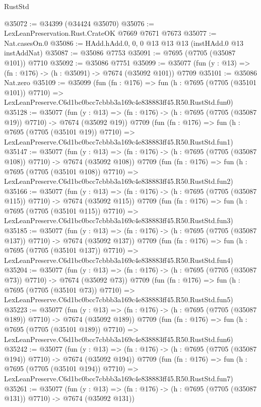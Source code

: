 \begin{lexlean}{RustStd}
\begin{coremodule}
@35072 := @34399 (@34424 @35070)
@35076 := LexLeanPreservation.Rust.CrateOK @7669 @7671 @7673
@35077 := Nat.casesOn.{0}
@35086 := HAdd.hAdd.{0, 0, 0} @13 @13 @13 (instHAdd.{0} @13 instAddNat)
@35087 := @35086 @7753
@35091 := @7695 (@7705 (@35087 @101)) @7710
@35092 := @35086 @7751
@35099 := @35077 (fun (y : @13) => (fn : @176) -> (h : @35091) -> @7674 (@35092 @101)) @7709
@35101 := @35086 Nat.zero
@35109 := @35099
    (fun (fn : @176) =>
    fun (h : @7695 (@7705 (@35101 @101)) @7710) =>
    LexLeanPreserve.C6d1bc0bcc7cbbb3a169c4e838883ff45.R50.RustStd.fun0)
@35128 := @35077
    (fun (y : @13) => (fn : @176) -> (h : @7695 (@7705 (@35087 @19)) @7710) -> @7674 (@35092 @19))
    @7709
    (fun (fn : @176) =>
    fun (h : @7695 (@7705 (@35101 @19)) @7710) =>
    LexLeanPreserve.C6d1bc0bcc7cbbb3a169c4e838883ff45.R50.RustStd.fun1)
@35147 := @35077
    (fun (y : @13) => (fn : @176) -> (h : @7695 (@7705 (@35087 @108)) @7710) -> @7674 (@35092 @108))
    @7709
    (fun (fn : @176) =>
    fun (h : @7695 (@7705 (@35101 @108)) @7710) =>
    LexLeanPreserve.C6d1bc0bcc7cbbb3a169c4e838883ff45.R50.RustStd.fun2)
@35166 := @35077
    (fun (y : @13) => (fn : @176) -> (h : @7695 (@7705 (@35087 @115)) @7710) -> @7674 (@35092 @115))
    @7709
    (fun (fn : @176) =>
    fun (h : @7695 (@7705 (@35101 @115)) @7710) =>
    LexLeanPreserve.C6d1bc0bcc7cbbb3a169c4e838883ff45.R50.RustStd.fun3)
@35185 := @35077
    (fun (y : @13) => (fn : @176) -> (h : @7695 (@7705 (@35087 @137)) @7710) -> @7674 (@35092 @137))
    @7709
    (fun (fn : @176) =>
    fun (h : @7695 (@7705 (@35101 @137)) @7710) =>
    LexLeanPreserve.C6d1bc0bcc7cbbb3a169c4e838883ff45.R50.RustStd.fun4)
@35204 := @35077
    (fun (y : @13) => (fn : @176) -> (h : @7695 (@7705 (@35087 @73)) @7710) -> @7674 (@35092 @73))
    @7709
    (fun (fn : @176) =>
    fun (h : @7695 (@7705 (@35101 @73)) @7710) =>
    LexLeanPreserve.C6d1bc0bcc7cbbb3a169c4e838883ff45.R50.RustStd.fun5)
@35223 := @35077
    (fun (y : @13) => (fn : @176) -> (h : @7695 (@7705 (@35087 @189)) @7710) -> @7674 (@35092 @189))
    @7709
    (fun (fn : @176) =>
    fun (h : @7695 (@7705 (@35101 @189)) @7710) =>
    LexLeanPreserve.C6d1bc0bcc7cbbb3a169c4e838883ff45.R50.RustStd.fun6)
@35242 := @35077
    (fun (y : @13) => (fn : @176) -> (h : @7695 (@7705 (@35087 @194)) @7710) -> @7674 (@35092 @194))
    @7709
    (fun (fn : @176) =>
    fun (h : @7695 (@7705 (@35101 @194)) @7710) =>
    LexLeanPreserve.C6d1bc0bcc7cbbb3a169c4e838883ff45.R50.RustStd.fun7)
@35261 := @35077
    (fun (y : @13) => (fn : @176) -> (h : @7695 (@7705 (@35087 @131)) @7710) -> @7674 (@35092 @131))

\end{coremodule}
\end{lexlean}
